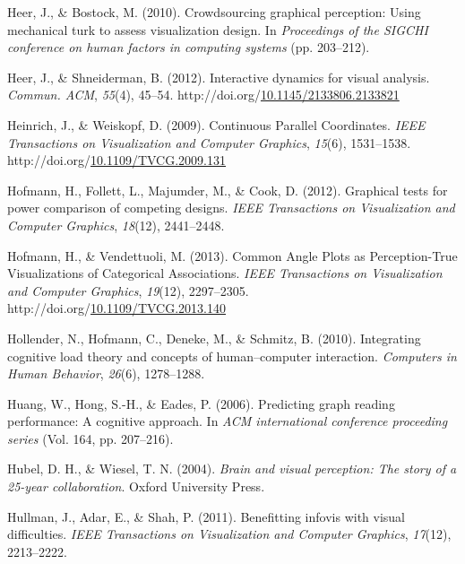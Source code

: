 \documentclass[print]{nuthesis}
\newlength{\cslhangindent}
\newenvironment{CSLReferences}[2]%
{\setlength{\parindent}{0pt}%
\everypar{\setlength{\hangindent}{\cslhangindent}}\ignorespaces}%
{\par}
\begin{document}
\begin{CSLReferences}{1}{0}
\leavevmode{}%
Heer, J., \& Bostock, M. (2010). Crowdsourcing graphical perception: Using mechanical turk to assess visualization design. In \emph{Proceedings of the SIGCHI conference on human factors in computing systems} (pp. 203--212).

\leavevmode{}%
Heer, J., \& Shneiderman, B. (2012). Interactive dynamics for visual analysis. \emph{Commun. ACM}, \emph{55}(4), 45--54. http://doi.org/\href{https://doi.org/10.1145/2133806.2133821}{10.1145/2133806.2133821}

\leavevmode{}%
Heinrich, J., \& Weiskopf, D. (2009). {Continuous Parallel Coordinates}. \emph{IEEE Transactions on Visualization and Computer Graphics}, \emph{15}(6), 1531--1538. http://doi.org/\href{https://doi.org/10.1109/TVCG.2009.131}{10.1109/TVCG.2009.131}

\leavevmode{}%
Hofmann, H., Follett, L., Majumder, M., \& Cook, D. (2012). Graphical tests for power comparison of competing designs. \emph{IEEE Transactions on Visualization and Computer Graphics}, \emph{18}(12), 2441--2448.

\leavevmode{}%
Hofmann, H., \& Vendettuoli, M. (2013). {Common Angle Plots as Perception-True Visualizations of Categorical Associations}. \emph{IEEE Transactions on Visualization and Computer Graphics}, \emph{19}(12), 2297--2305. http://doi.org/\href{https://doi.org/10.1109/TVCG.2013.140}{10.1109/TVCG.2013.140}

\leavevmode{}%
Hollender, N., Hofmann, C., Deneke, M., \& Schmitz, B. (2010). Integrating cognitive load theory and concepts of human--computer interaction. \emph{Computers in Human Behavior}, \emph{26}(6), 1278--1288.

\leavevmode{}%
Huang, W., Hong, S.-H., \& Eades, P. (2006). Predicting graph reading performance: A cognitive approach. In \emph{ACM international conference proceeding series} (Vol. 164, pp. 207--216).

\leavevmode{}%
Hubel, D. H., \& Wiesel, T. N. (2004). \emph{Brain and visual perception: The story of a 25-year collaboration}. Oxford University Press.

\leavevmode{}%
Hullman, J., Adar, E., \& Shah, P. (2011). Benefitting infovis with visual difficulties. \emph{IEEE Transactions on Visualization and Computer Graphics}, \emph{17}(12), 2213--2222.


\end{CSLReferences}
\end{document}
